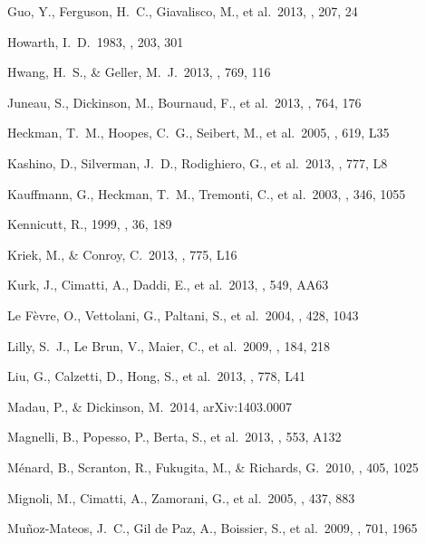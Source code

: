 \documentclass[referee]{aa}
\begin{document}
\begin{thebibliography}{}
 Guo, Y., Ferguson, H.~C., 
Giavalisco, M., et al.\ 2013, \apjs, 207, 24

 Howarth, I.~D.\ 1983, \mnras, 203, 301

 Hwang, H.~S., \& Geller, M.~J.\ 2013,
\apj, 769, 116

 Juneau, S., Dickinson, 
M., Bournaud, F., et al.\ 2013, \apj, 764, 176

 Heckman, T.~M., Hoopes, 
C.~G., Seibert, M., et al.\ 2005, \apjl, 619, L35

 Kashino, D., Silverman, 
J.~D., Rodighiero, G., et al.\ 2013, \apjl, 777, L8

 Kauffmann, G., 
Heckman, T.~M., Tremonti, C., et al.\ 2003, \mnras, 346, 1055

 Kennicutt, R., 1999, \araa, 36, 189

 Kriek, M., \& Conroy, C.\ 2013,
\apjl, 775, L16 

 Kurk, J., Cimatti, A., Daddi, E., et al.\
2013, \aap, 549, AA63

 Le F{\`e}vre, O., Vettolani, G.,
Paltani, S., et al.\ 2004, \aap, 428, 1043

 Lilly, S.~J., Le Brun, V.,
Maier, C., et al.\ 2009, \apjs, 184, 218

 Liu, G., Calzetti, D., 
Hong, S., et al.\ 2013, \apjl, 778, L41

 Madau, P., \& Dickinson, M.\ 2014,
arXiv:1403.0007

 Magnelli, B., Popesso, P.,
Berta, S., et al.\ 2013, \aap, 553, A132

 M{\'e}nard, B., Scranton, R.,
Fukugita, M., \& Richards, G.\ 2010, \mnras, 405, 1025

 Mignoli, M., Cimatti, A., Zamorani,
G., et al.\ 2005, \aap, 437, 883

Mu{\~n}oz-Mateos, J.~C., Gil de Paz, A., Boissier, S., et al.\ 2009, \apj, 
701, 1965


\end{thebibliography}
\end{document}
